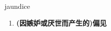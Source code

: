 
\begin{frame}
{\huge jaundice}
\begin{center}
\begin{enumerate}\Large
  \item \textbf{(因嫉妒或厌世而产生的)偏见}
\end{enumerate}
\end{center}
\end{frame}
